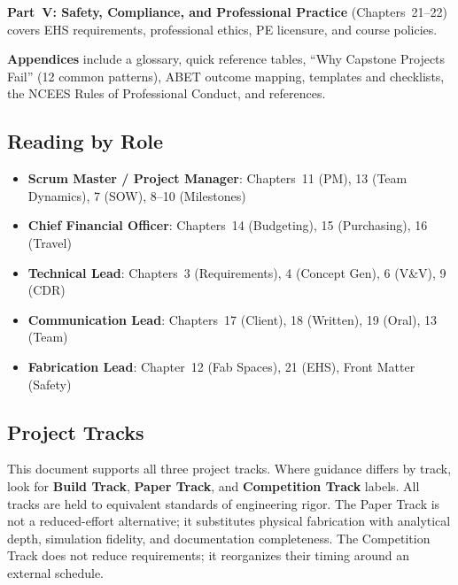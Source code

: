 \textbf{Part~V: Safety, Compliance, and Professional Practice} (Chapters~21--22) covers EHS requirements, professional ethics, PE licensure, and course policies.

\textbf{Appendices} include a glossary, quick reference tables, ``Why Capstone Projects Fail'' (12 common patterns), ABET outcome mapping, templates and checklists, the NCEES Rules of Professional Conduct, and references.

\subsection*{Reading by Role}
\begin{itemize}[nosep,leftmargin=1.5em]
\item \textbf{Scrum Master / Project Manager}: Chapters~11 (PM), 13 (Team Dynamics), 7 (SOW), 8--10 (Milestones)
\item \textbf{Chief Financial Officer}: Chapters~14 (Budgeting), 15 (Purchasing), 16 (Travel)
\item \textbf{Technical Lead}: Chapters~3 (Requirements), 4 (Concept Gen), 6 (V\&V), 9 (CDR)
\item \textbf{Communication Lead}: Chapters~17 (Client), 18 (Written), 19 (Oral), 13 (Team)
\item \textbf{Fabrication Lead}: Chapter~12 (Fab Spaces), 21 (EHS), Front Matter (Safety)
\end{itemize}

\subsection*{Project Tracks}
This document supports all three project tracks. Where guidance differs by track, look for \textbf{Build Track}, \textbf{Paper Track}, and \textbf{Competition Track} labels. All tracks are held to equivalent standards of engineering rigor. The Paper Track is not a reduced-effort alternative; it substitutes physical fabrication with analytical depth, simulation fidelity, and documentation completeness. The Competition Track does not reduce requirements; it reorganizes their timing around an external schedule.


